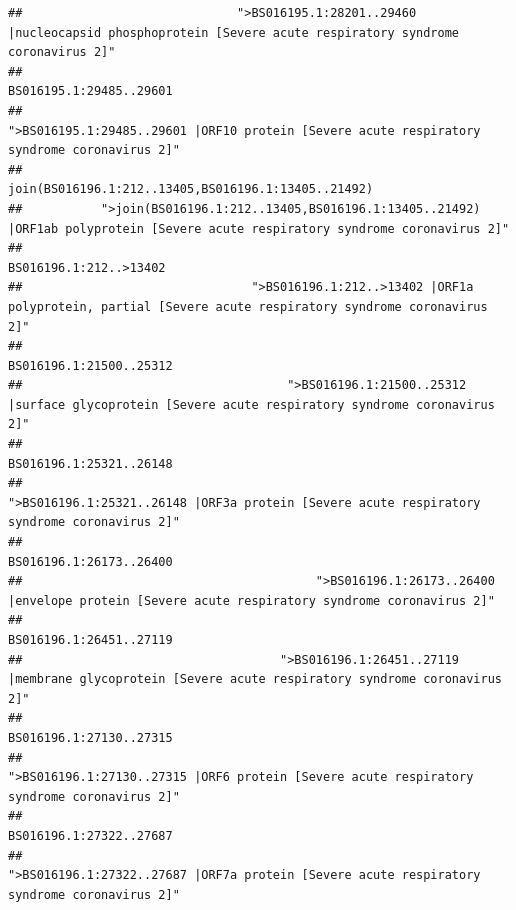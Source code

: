 \documentclass[
]{article}
\begin{document}
\begin{verbatim}
##                              ">BS016195.1:28201..29460 |nucleocapsid phosphoprotein [Severe acute respiratory syndrome coronavirus 2]" 
##                                                                                                                BS016195.1:29485..29601 
##                                            ">BS016195.1:29485..29601 |ORF10 protein [Severe acute respiratory syndrome coronavirus 2]" 
##                                                                                    join(BS016196.1:212..13405,BS016196.1:13405..21492) 
##           ">join(BS016196.1:212..13405,BS016196.1:13405..21492) |ORF1ab polyprotein [Severe acute respiratory syndrome coronavirus 2]" 
##                                                                                                                 BS016196.1:212..>13402 
##                                ">BS016196.1:212..>13402 |ORF1a polyprotein, partial [Severe acute respiratory syndrome coronavirus 2]" 
##                                                                                                                BS016196.1:21500..25312 
##                                     ">BS016196.1:21500..25312 |surface glycoprotein [Severe acute respiratory syndrome coronavirus 2]" 
##                                                                                                                BS016196.1:25321..26148 
##                                            ">BS016196.1:25321..26148 |ORF3a protein [Severe acute respiratory syndrome coronavirus 2]" 
##                                                                                                                BS016196.1:26173..26400 
##                                         ">BS016196.1:26173..26400 |envelope protein [Severe acute respiratory syndrome coronavirus 2]" 
##                                                                                                                BS016196.1:26451..27119 
##                                    ">BS016196.1:26451..27119 |membrane glycoprotein [Severe acute respiratory syndrome coronavirus 2]" 
##                                                                                                                BS016196.1:27130..27315 
##                                             ">BS016196.1:27130..27315 |ORF6 protein [Severe acute respiratory syndrome coronavirus 2]" 
##                                                                                                                BS016196.1:27322..27687 
##                                            ">BS016196.1:27322..27687 |ORF7a protein [Severe acute respiratory syndrome coronavirus 2]" 

\end{verbatim}
\end{document}
